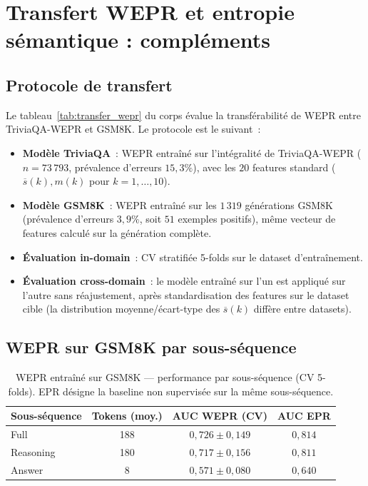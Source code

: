 \documentclass[12pt,a4paper]{article}
\begin{document}
\section{Transfert WEPR et entropie sémantique : compléments}
\label{ann:transfert}

\subsection{Protocole de transfert}

Le tableau~\ref{tab:transfer_wepr} du corps évalue la transférabilité de WEPR entre TriviaQA-WEPR et GSM8K. Le protocole est le suivant~:
\begin{itemize}[itemsep=0pt,topsep=2pt]
    \item \textbf{Modèle TriviaQA}~: WEPR entraîné sur l'intégralité de TriviaQA-WEPR ($n = 73\,793$, prévalence d'erreurs $15{,}3\%$), avec les $20$ features standard ($\overline{s}(k), m(k)$ pour $k=1,\ldots,10$).
    \item \textbf{Modèle GSM8K}~: WEPR entraîné sur les $1\,319$ générations GSM8K (prévalence d'erreurs $3{,}9\%$, soit $51$ exemples positifs), même vecteur de features calculé sur la génération complète.
    \item \textbf{Évaluation in-domain}~: CV stratifiée 5-folds sur le dataset d'entraînement.
    \item \textbf{Évaluation cross-domain}~: le modèle entraîné sur l'un est appliqué sur l'autre sans réajustement, après standardisation des features sur le dataset cible (la distribution moyenne/écart-type des $\overline{s}(k)$ diffère entre datasets).
\end{itemize}

\subsection{WEPR sur GSM8K par sous-séquence}

\begin{table}[H]
\centering
\caption{WEPR entraîné sur GSM8K — performance par sous-séquence (CV 5-folds). EPR désigne la baseline non supervisée sur la même sous-séquence.}
\small
\begin{tabular}{lccc}
\toprule
Sous-séquence & Tokens (moy.) & AUC WEPR (CV) & AUC EPR \\
\midrule
Full      & 188 & $0{,}726 \pm 0{,}149$ & $0{,}814$ \\
Reasoning & 180 & $0{,}717 \pm 0{,}156$ & $0{,}811$ \\
Answer    &   8 & $0{,}571 \pm 0{,}080$ & $0{,}640$ \\
\bottomrule
\end{tabular}
\end{table}
\end{document}
